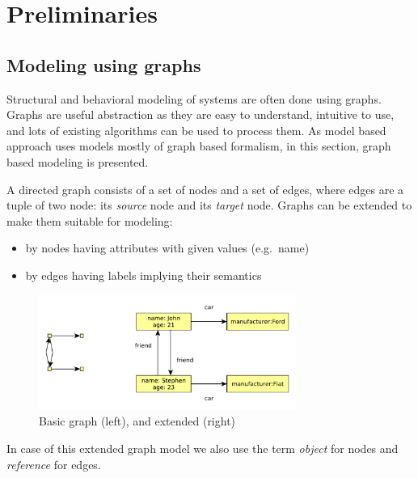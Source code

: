 
\chapter{Preliminaries}


\section{Modeling using graphs}

Structural and behavioral modeling of systems are often done using graphs. 
Graphs are useful abstraction as they are easy to understand, intuitive to use, and lots of existing algorithms can be used to process them. 
As model based approach uses models mostly of graph based formalism, in this section, graph based modeling is presented.

A directed graph consists of a set of nodes and a set of edges, where edges are a tuple of two node: its \emph{source} node and its \emph{target} node. 
Graphs can be extended to make them suitable for modeling:

\begin{itemize}
	\item by nodes having attributes with given values (e.g.\ name)
	\item by edges having labels implying their semantics
\end{itemize}


\begin{figure}[h]
	\begin{center}
		\includegraphics[width=0.75\textwidth]{figures/graphs.pdf}
		\caption{Basic graph (left), and extended (right) }
		\label{fig:graphs}
	\end{center}
\end{figure}

In case of this extended graph model we also use the term \emph{object} for nodes and \emph{reference} for edges.

